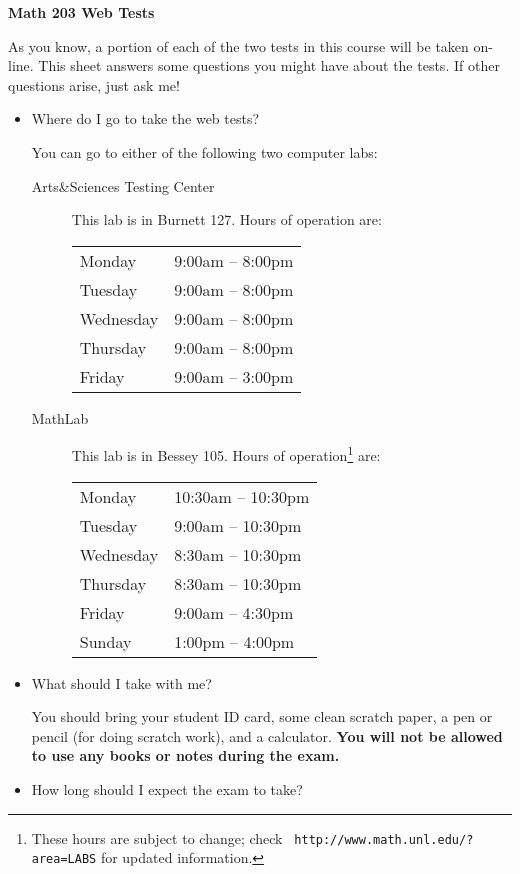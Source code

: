 \documentclass[11pt]{article}
\begin{document}
\begin{center}
\LARGE\bfseries{Math 203 Web Tests}
\end{center}

As you know, a portion of each of the two tests in this course will be
taken on-line.  This sheet answers some questions you might have about
the tests.  If other questions arise, just ask me!

\begin{itemize}
\item Where do I go to take the web tests?

You can go to either of the following two computer labs:
\begin{description}
\item[Arts\&Sciences Testing Center]  This lab is in Burnett
127.  Hours of operation are:

\begin{tabular}{ll}
Monday & 9:00am -- 8:00pm \\
Tuesday & 9:00am -- 8:00pm \\
Wednesday & 9:00am -- 8:00pm \\
Thursday & 9:00am -- 8:00pm \\
Friday & 9:00am -- 3:00pm
\end{tabular}
\item[MathLab] This lab is in Bessey 105.  Hours of
operation\footnote{These hours are subject to change; check {\tt
http://www.math.unl.edu/?area=LABS} for updated information.} are:

\begin{tabular}{ll}
Monday & 10:30am -- 10:30pm \\
Tuesday & 9:00am --  10:30pm \\
Wednesday & 8:30am -- 10:30pm \\
Thursday & 8:30am -- 10:30pm \\
Friday & 9:00am -- 4:30pm\\
Sunday & 1:00pm -- 4:00pm
\end{tabular}
\end{description}

\item What should I take with me?

You should bring your student ID card, some clean scratch paper, a pen
or pencil (for doing scratch work), and a calculator.  {\bf You will
not be allowed to use any books or notes during the exam.}

\item How long should I expect the exam to take?


\end{itemize}
\end{document}
